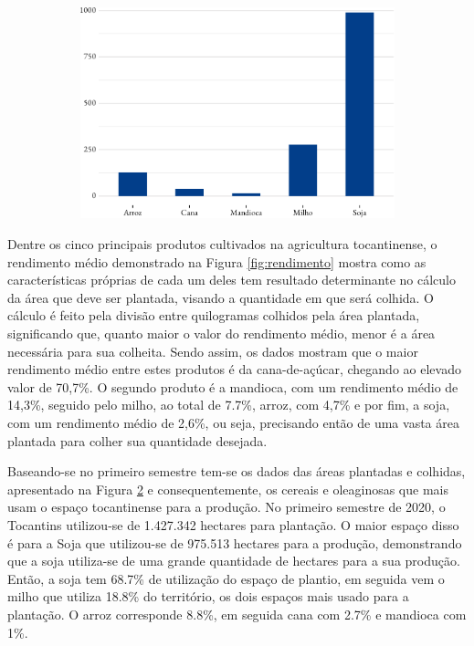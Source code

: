 \begin{figure}[!h]
\begin{subfigure}{\linewidth}
		\includegraphics{fig/area_plantada-1.pdf}
		\label{fig:areaplantada}
	\end{subfigure}
\end{figure}

\par Dentre os cinco principais produtos cultivados na agricultura tocantinense, o rendimento médio demonstrado na Figura \ref{fig:rendimento} mostra como as características próprias de cada um deles tem resultado determinante no cálculo da área que deve ser plantada, visando a quantidade em que será colhida. O cálculo é feito pela divisão entre quilogramas colhidos pela área plantada, significando que, quanto maior o valor do rendimento médio, menor é a área necessária para sua colheita. Sendo assim, os dados mostram que o maior rendimento médio entre estes produtos é da cana-de-açúcar, chegando ao elevado valor de 70,7\%. O segundo produto é a mandioca, com um rendimento médio de 14,3\%, seguido pelo milho, ao total de 7.7\%, arroz, com 4,7\% e por fim, a soja, com um rendimento médio de 2,6\%, ou seja, precisando então de uma vasta área plantada para colher sua quantidade desejada.


\par Baseando-se no primeiro semestre tem-se os dados das áreas plantadas e colhidas, apresentado na Figura \ref{fig:areaplantada} e consequentemente, os cereais e oleaginosas que mais usam o espaço tocantinense para a produção. No primeiro semestre de 2020, o Tocantins utilizou-se de 1.427.342 hectares para plantação. O maior espaço disso é para a Soja que utilizou-se de 975.513 hectares para a produção, demonstrando que a soja utiliza-se de uma grande quantidade de hectares para a sua produção. Então, a soja tem 68.7\% de utilização do espaço de plantio, em seguida vem o milho que utiliza 18.8\% do território, os dois espaços mais usado para a plantação. O arroz corresponde 8.8\%, em seguida cana com 2.7\% e mandioca com 1\%.

